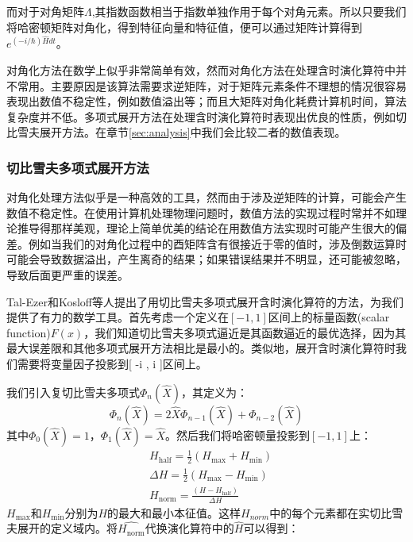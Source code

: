 而对于对角矩阵$\Lambda$,其指数函数相当于指数单独作用于每个对角元素。所以只要我们将哈密顿矩阵对角化，得到特征向量和特征值，便可以通过矩阵计算得到$e^{(-i/\hbar)\hat{H}dt}$。\par 
对角化方法在数学上似乎非常简单有效，然而对角化方法在处理含时演化算符中并不常用。主要原因是该算法需要求逆矩阵，对于矩阵元素条件不理想的情况很容易表现出数值不稳定性，例如数值溢出等；而且大矩阵对角化耗费计算机时间，算法复杂度并不低。多项式展开方法在处理含时演化算符时表现出优良的性质，例如切比雪夫展开方法。在章节\ref{sec:analysis}中我们会比较二者的数值表现。

\subsubsection{切比雪夫多项式展开方法}
对角化处理方法似乎是一种高效的工具，然而由于涉及逆矩阵的计算，可能会产生数值不稳定性。在使用计算机处理物理问题时，数值方法的实现过程时常并不如理论推导得那样美观，理论上简单优美的结论在用数值方法实现时可能产生很大的偏差。例如当我们的对角化过程中的酉矩阵含有很接近于零的值时，涉及倒数运算时可能会导致数据溢出，产生离奇的结果；如果错误结果并不明显，还可能被忽略，导致后面更严重的误差。\par 
Tal-Ezer和Kosloff等人提出了用切比雪夫多项式展开含时演化算符的方法，为我们提供了有力的数学工具。首先考虑一个定义在$[-1,1]$区间上的标量函数(scalar function)$F(x)$，我们知道切比雪夫多项式逼近是其函数逼近的最优选择，因为其最大误差限和其他多项式展开方法相比是最小的。类似地，展开含时演化算符时我们需要将变量因子投影到[ -i , i ]区间上。\par 
我们引入复切比雪夫多项式$\Phi_n(\hat{X})$，其定义为：
\begin{equation}
  \Phi_n(\hat{X}) = 2\hat{X}\Phi_{n-1}(\hat{X}) + \Phi_{n-2}(\hat{X})
\end{equation}
其中$\Phi_0(\hat{X}) = 1$，$\Phi_1(\hat{X}) = \hat{X}$。然后我们将哈密顿量投影到$[-1,1]$上：
\begin{equation}
\begin{split}
  &H_{\text{half}}  =  \frac{1}{2}(H_{\text{max}} + H_{\text{min}}) \nonumber \\ 
  &\Delta H  =  \frac{1}{2} (H_{\text{max}} - H_{\text{min}}) \nonumber \\
  &H_{\text{norm}}  =  \frac{(H - H_{\text{half}})} {\Delta H}
\end{split}
\end{equation}
$H_{\text{max}}$和$H_{\text{min}}$分别为$H$的最大和最小本征值。这样$H_{norm}$中的每个元素都在实切比雪夫展开的定义域内。将$\hat{H_{\text{norm}}}$代换演化算符中的$\hat{H}$可以得到：
